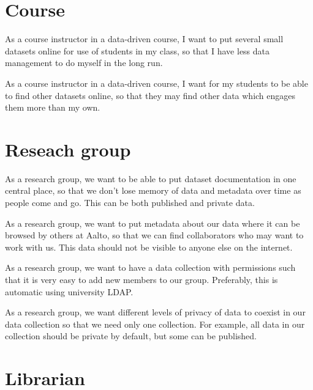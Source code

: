 \section{Course}

\begin{compactitem}
    \item As a course instructor in a data-driven course, I want to put several
          small datasets online for use of students in my class, so that I have
          less data management to do myself in the long run.
    \item As a course instructor in a data-driven course, I want for my students
          to be able to find other datasets online, so that they may find other
          data which engages them more than my own.
\end{compactitem}

\section{Reseach group}

\begin{compactitem}
    \item As a research group, we want to be able to put dataset documentation
          in one central place, so that we don't lose memory of data and
          metadata over time as people come and go.  This can be both published
          and private data.
    \item As a research group, we want to put metadata about our data where it
          can be browsed by others at Aalto, so that we can find collaborators
          who may want to work with us.  This data should not be visible to
          anyone else on the internet.
    \item As a research group, we want to have a data collection with
          permissions such that it is very easy to add new members to our
          group. Preferably, this is automatic using university LDAP.
    \item As a research group, we want different levels of privacy of data to
          coexist in our data collection so that we need only one collection.
          For example, all data in our collection should be private by default,
          but some can be published.
\end{compactitem}

\section{Librarian}

